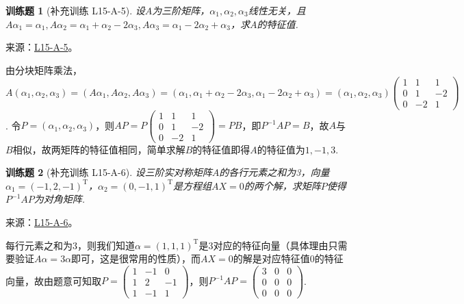 \documentclass[UTF8,12pt,a4paper,fontset=fandol]{ctexart}
\newtheorem{exercise}{训练题}[section]
\begin{document}
\begin{exercise}[补充训练 L15-A-5]\label{prob:L15-A-5}
设$A$为三阶矩阵，$\alpha_1,\alpha_2,\alpha_3$线性无关，且$A\alpha_1=\alpha_1,A\alpha_2=\alpha_1+\alpha_2-2\alpha_3,A\alpha_3=\alpha_1-2\alpha_2+\alpha_3$，求$A$的特征值.
\end{exercise}
\noindent 来源：\href{https://github.com/yhwu-is/Linear-Algebra-Left-Undone/blob/new/%E8%AE%B2%E4%B9%89/%E4%B8%93%E9%A2%98/15%20%E7%9B%B8%E4%BC%BC%E6%A0%87%E5%87%86%E5%BD%A2%EF%BC%9A%E5%A4%8D%E6%95%B0%E5%9F%9F%E4%B8%8A%E7%9A%84%E5%B0%9D%E8%AF%95%E4%B8%8E%E7%90%86%E8%AE%BA.tex}{L15-A-5}。
\begin{solve}
由分块矩阵乘法，
\[A(\alpha_1,\alpha_2,\alpha_3)=(A\alpha_1,A\alpha_2,A\alpha_3)=(\alpha_1,\alpha_1+\alpha_2-2\alpha_3,\alpha_1-2\alpha_2+\alpha_3)=(\alpha_1,\alpha_2,\alpha_3)\begin{pmatrix}
                1 & 1 & 1 \\ 0 & 1 & -2 \\ 0 & -2 & 1
            \end{pmatrix}\]
. 令$P=(\alpha_1,\alpha_2,\alpha_3)$，则$AP=P\begin{pmatrix}
                1 & 1 & 1 \\ 0 & 1 & -2 \\ 0 & -2 & 1
            \end{pmatrix}=PB$，即$P^{-1}AP=B$，故$A$与$B$相似，故两矩阵的特征值相同，简单求解$B$的特征值即得$A$的特征值为$1,-1,3$.
\end{solve}

\begin{exercise}[补充训练 L15-A-6]\label{prob:L15-A-6}
设三阶实对称矩阵$A$的各行元素之和为3，向量$\alpha_1=(-1,2,-1)^\mathrm{T}$，$\alpha_2=(0,-1,1)^\mathrm{T}$是方程组$AX=0$的两个解，求矩阵$P$使得$P^{-1}AP$为对角矩阵.
\end{exercise}
\noindent 来源：\href{https://github.com/yhwu-is/Linear-Algebra-Left-Undone/blob/new/%E8%AE%B2%E4%B9%89/%E4%B8%93%E9%A2%98/15%20%E7%9B%B8%E4%BC%BC%E6%A0%87%E5%87%86%E5%BD%A2%EF%BC%9A%E5%A4%8D%E6%95%B0%E5%9F%9F%E4%B8%8A%E7%9A%84%E5%B0%9D%E8%AF%95%E4%B8%8E%E7%90%86%E8%AE%BA.tex}{L15-A-6}。
\begin{solve}
每行元素之和为3，则我们知道$\alpha=(1,1,1)^\mathrm{T}$是3对应的特征向量（具体理由只需要验证$A\alpha=3\alpha$即可，这是很常用的性质），而$AX=0$的解是对应特征值0的特征向量，故由题意可知取$P=\begin{pmatrix}
                1 & -1 & 0 \\ 1 & 2 & -1 \\ 1 & -1 & 1
            \end{pmatrix}$，则$P^{-1}AP=\begin{pmatrix}
                3 & 0 & 0 \\ 0 & 0 & 0 \\ 0 & 0 & 0
            \end{pmatrix}$.
\end{solve}
\end{document}
